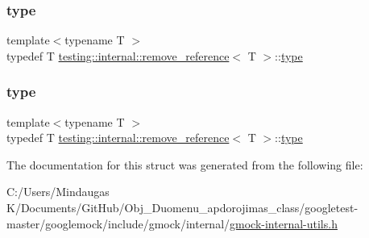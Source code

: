 \mbox{\label{structtesting_1_1internal_1_1remove__reference_a291edca52c59a0d211977d4802439b8a}} 
\subsubsection{\texorpdfstring{type}{type}\hspace{0.1cm}{\footnotesize\ttfamily [2/3]}}
{\footnotesize\ttfamily template$<$typename T $>$ \\
typedef T \mbox{\hyperlink{structtesting_1_1internal_1_1remove__reference}{testing\+::internal\+::remove\+\_\+reference}}$<$ T $>$\+::\mbox{\hyperlink{structtesting_1_1internal_1_1remove__reference_a291edca52c59a0d211977d4802439b8a}{type}}}

\mbox{\label{structtesting_1_1internal_1_1remove__reference_a291edca52c59a0d211977d4802439b8a}} 
\subsubsection{\texorpdfstring{type}{type}\hspace{0.1cm}{\footnotesize\ttfamily [3/3]}}
{\footnotesize\ttfamily template$<$typename T $>$ \\
typedef T \mbox{\hyperlink{structtesting_1_1internal_1_1remove__reference}{testing\+::internal\+::remove\+\_\+reference}}$<$ T $>$\+::\mbox{\hyperlink{structtesting_1_1internal_1_1remove__reference_a291edca52c59a0d211977d4802439b8a}{type}}}



The documentation for this struct was generated from the following file\+:\begin{DoxyCompactItemize}
\item 
C\+:/\+Users/\+Mindaugas K/\+Documents/\+Git\+Hub/\+Obj\+\_\+\+Duomenu\+\_\+apdorojimas\+\_\+class/googletest-\/master/googlemock/include/gmock/internal/\mbox{\hyperlink{googletest-master_2googlemock_2include_2gmock_2internal_2gmock-internal-utils_8h}{gmock-\/internal-\/utils.\+h}}\end{DoxyCompactItemize}
